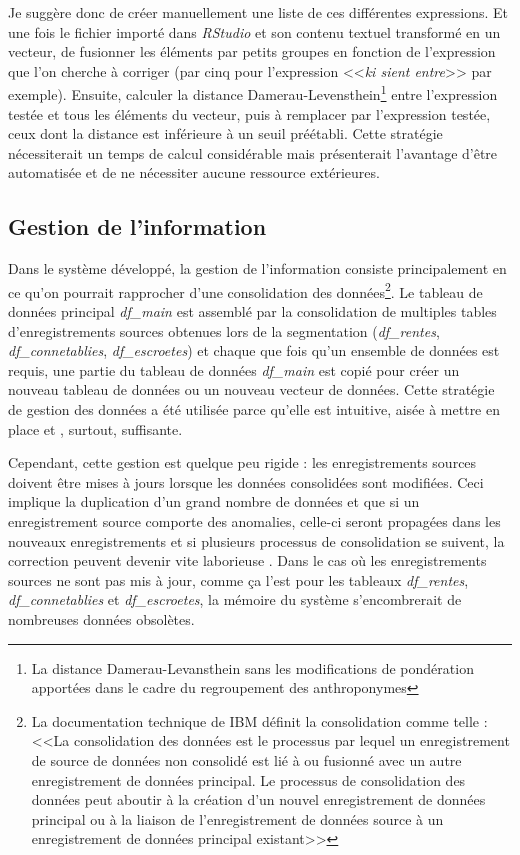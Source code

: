 Je suggère donc de créer manuellement une liste de ces différentes expressions. Et une fois le fichier importé dans \textit{RStudio} et son contenu textuel transformé en un vecteur, de fusionner les éléments par petits groupes en fonction de l'expression que l'on cherche à corriger (par cinq pour l'expression <<\textit{ki sient entre}>> par exemple). 
Ensuite, calculer la distance Damerau-Levensthein\footnote{La distance Damerau-Levansthein sans les modifications de pondération apportées dans le cadre du regroupement des anthroponymes} entre l'expression testée et tous les éléments du vecteur, puis à remplacer par l'expression testée, ceux dont la distance est inférieure à un seuil préétabli. %
Cette stratégie nécessiterait un temps de calcul considérable mais présenterait l'avantage d'être automatisée et de ne nécessiter aucune ressource extérieures.

\subsection{Gestion de l'information}
Dans le système développé, la gestion de l'information consiste  principalement en ce qu'on pourrait rapprocher d'une consolidation des données\footnote{La documentation technique de IBM définit la consolidation comme telle : <<La consolidation des données est le processus par lequel un enregistrement de source de données non consolidé est lié à ou fusionné avec un autre enregistrement de données principal. Le processus de consolidation des données peut aboutir à la création d'un nouvel enregistrement de données principal ou à la liaison de l'enregistrement de données source à un enregistrement de données principal existant>> }. Le tableau de données principal \textit{df\_main} est assemblé par la consolidation de multiples tables d'enregistrements sources obtenues lors de la segmentation (\textit{df\_rentes}, \textit{df\_connetablies}, \textit{df\_escroetes}) et chaque que fois qu'un ensemble de données est requis, une partie du tableau de données \textit{df\_main} est copié pour créer un nouveau tableau de données ou un nouveau vecteur de données. Cette stratégie de gestion des données  a été utilisée parce qu'elle est intuitive, aisée à mettre en place et , surtout, suffisante.

Cependant, cette gestion est quelque peu rigide :  les enregistrements sources doivent être mises à jours lorsque les données consolidées sont modifiées. Ceci implique la duplication d'un grand nombre de données et que si un enregistrement source comporte des anomalies, celle-ci seront propagées dans les nouveaux enregistrements et si plusieurs processus de consolidation se suivent,  la correction peuvent devenir vite laborieuse \parencite{boydens_qualite_2021}. Dans le cas où  les enregistrements sources ne sont pas mis à jour, comme ça l'est pour les tableaux  \textit{df\_rentes}, \textit{df\_connetablies} et \textit{df\_escroetes}, la mémoire du système s'encombrerait de nombreuses données obsolètes.


